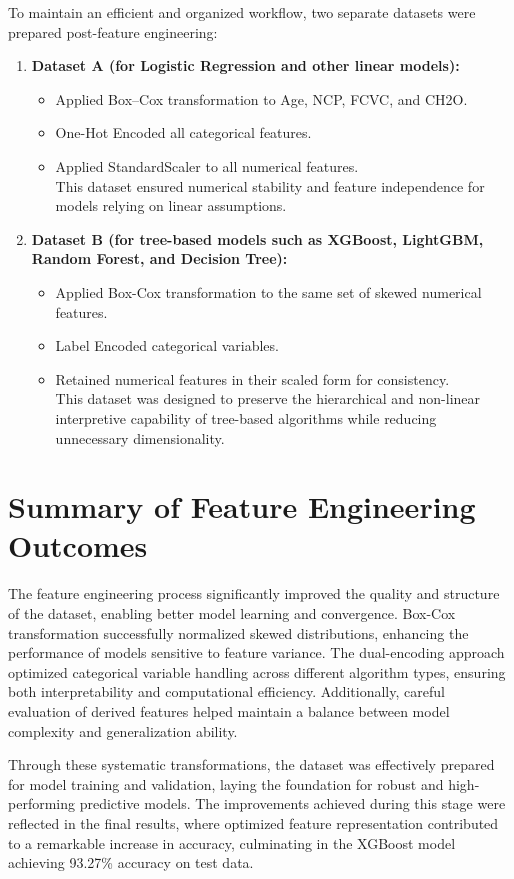 To maintain an efficient and organized workflow, two separate datasets were prepared post-feature engineering:

\begin{enumerate}
    \item \textbf{Dataset A (for Logistic Regression and other linear models):}
    \begin{itemize}
        \item Applied Box–Cox transformation to Age, NCP, FCVC, and CH2O.
        \item One-Hot Encoded all categorical features.
        \item Applied StandardScaler to all numerical features. \\ This dataset ensured numerical stability and feature independence for models relying on linear assumptions.
    \end{itemize}

    \item \textbf{Dataset B (for tree-based models such as XGBoost, LightGBM, Random Forest, and Decision Tree):}
    \begin{itemize}
        \item Applied Box-Cox transformation to the same set of skewed numerical features.
        \item Label Encoded categorical variables.
        \item Retained numerical features in their scaled form for consistency. \\ This dataset was designed to preserve the hierarchical and non-linear interpretive capability of tree-based algorithms while reducing unnecessary dimensionality.
    \end{itemize}
\end{enumerate}



\section{Summary of Feature Engineering Outcomes}\label{sec:summary-of-feature-engineering-outcomes}

The feature engineering process significantly improved the quality and structure of the dataset, enabling better model learning and convergence.
Box-Cox transformation successfully normalized skewed distributions, enhancing the performance of models sensitive to feature variance.
The dual-encoding approach optimized categorical variable handling across different algorithm types, ensuring both interpretability and computational efficiency.
Additionally, careful evaluation of derived features helped maintain a balance between model complexity and generalization ability.

Through these systematic transformations, the dataset was effectively prepared for model training and validation, laying the foundation for robust and high-performing predictive models.
The improvements achieved during this stage were reflected in the final results, where optimized feature representation contributed to a remarkable increase in accuracy, culminating in the XGBoost model achieving 93.27\% accuracy on test data.
